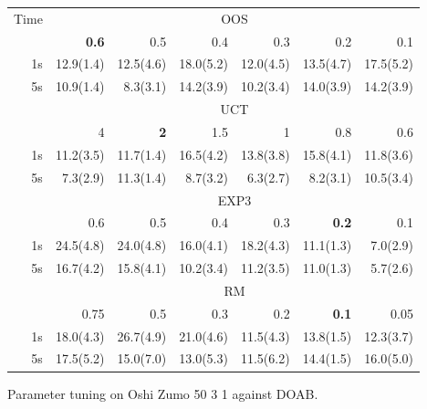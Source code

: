 \begin{figure}
\begin{footnotesize}
\begin{tabular}{|r|rrrrrr|}\hline
Time&\multicolumn{6}{|c|}{OOS}\\
&\textbf{0.6}&0.5&0.4&0.3&0.2&0.1\\
1s&12.9(1.4)&12.5(4.6)&18.0(5.2)&12.0(4.5)&13.5(4.7)&17.5(5.2)\\
5s&10.9(1.4)&8.3(3.1)&14.2(3.9)&10.2(3.4)&14.0(3.9)&14.2(3.9)\\\hline
&\multicolumn{6}{|c|}{UCT}\\
&4&\textbf{2}&1.5&1&0.8&0.6\\
1s&11.2(3.5)&11.7(1.4)&16.5(4.2)&13.8(3.8)&15.8(4.1)&11.8(3.6)\\
5s&7.3(2.9)&11.3(1.4)&8.7(3.2)&6.3(2.7)&8.2(3.1)&10.5(3.4)\\\hline
&\multicolumn{6}{|c|}{EXP3}\\
&0.6&0.5&0.4&0.3&\textbf{0.2}&0.1\\
1s&24.5(4.8)&24.0(4.8)&16.0(4.1)&18.2(4.3)&11.1(1.3)&7.0(2.9)\\
5s&16.7(4.2)&15.8(4.1)&10.2(3.4)&11.2(3.5)&11.0(1.3)&5.7(2.6)\\\hline
&\multicolumn{6}{|c|}{RM}\\
&0.75&0.5&0.3&0.2&\textbf{0.1}&0.05\\
1s&18.0(4.3)&26.7(4.9)&21.0(4.6)&11.5(4.3)&13.8(1.5)&12.3(3.7)\\
5s&17.5(5.2)&15.0(7.0)&13.0(5.3)&11.5(6.2)&14.4(1.5)&16.0(5.0)\\\hline
\end{tabular}
\end{footnotesize}
\caption{Parameter tuning on Oshi Zumo 50 3 1 against DOAB.}
\end{figure}


